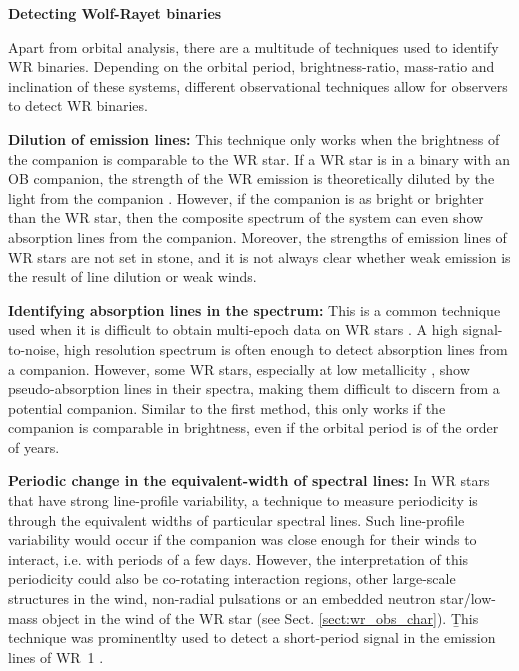 \textbf{Detecting Wolf-Rayet binaries}\label{sect:detection_methods}

Apart from orbital analysis, there are a multitude of techniques used to identify WR binaries. Depending on the orbital period, brightness-ratio, mass-ratio and inclination of these systems, different observational techniques allow for observers to detect WR binaries.

\textbf{Dilution of emission lines:} This technique only works when the brightness of the companion is comparable to the WR star. If a WR star is in a binary with an OB companion, the strength of the WR emission is theoretically diluted by the light from the companion \citep{1968aSmith,1989ContiMassey,2007Crowther}. However, if the companion is as bright or brighter than the WR star, then the composite spectrum of the system can even show absorption lines from the companion. Moreover, the strengths of emission lines of WR stars are not set in stone, and it is not always clear whether weak emission is the result of line dilution or weak winds.

\textbf{Identifying absorption lines in the spectrum:} This is a common technique used when it is difficult to obtain multi-epoch data on WR stars \citep[e.g.,][]{1989ContiMassey}. A high signal-to-noise, high resolution spectrum is often enough to detect absorption lines from a companion. However, some WR stars, especially at low metallicity \citep[e.g.,][]{hainich_wolf-rayet_2015}, show pseudo-absorption lines in their spectra, making them difficult to discern from a potential companion. Similar to the first method, this only works if the companion is comparable in brightness, even if the orbital period is of the order of years.

\textbf{Periodic change in the equivalent-width of spectral lines:} In WR stars that have strong line-profile variability, a technique to measure periodicity is through the equivalent widths of particular spectral lines. Such line-profile variability would occur if the companion was close enough for their winds to interact, i.e. with periods of a few days. However, the interpretation of this periodicity could also be co-rotating interaction regions, other large-scale structures in the wind, non-radial pulsations or an embedded neutron star/low-mass object in the wind of the WR star (see Sect. \ref{sect:wr_obs_char}). \b{This technique was prominentlty used to detect a short-period signal in the emission lines of WR~1 \citep[][]{morel_investigation_1999}.}

